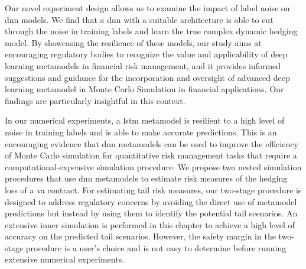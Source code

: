Our novel experiment design allows us to examine the impact of label noise on \gls{dnn} models.
We find that a \gls{dnn} with a suitable architecture is able to cut through the noise in training labels and learn the true complex dynamic hedging model.
By showcasing the resilience of these models, our study aims at encouraging regulatory bodies to recognize the value and applicability of deep learning metamodels in financial risk management, and it provides informed suggestions and guidance for the incorporation and oversight of advanced deep learning metamodel in Monte Carlo Simulation in financial applications.
Our findings are particularly insightful in this context.

In our numerical experiments, a \gls{lstm} metamodel is resilient to a high level of noise in training labels and is able to make accurate predictions. 
This is an encouraging evidence that \gls{dnn} metamodels can be used to improve the efficiency of Monte Carlo simulation for quantitative risk management tasks that require a computational-expensive simulation procedure.
We propose two nested simulation procedures that use \gls{dnn} metamodels to estimate risk measures of the hedging loss of a \gls{va} contract.
For estimating tail risk measures, our two-stage procedure is designed to address regulatory concerns by avoiding the direct use of metamodel predictions but instead by using them to identify the potential tail scenarios.
An extensive inner simulation is performed in this chapter to achieve a high level of accuracy on the predicted tail scenarios.
However, the safety margin in the two-stage procedure is a user's choice and is not easy to determine before running extensive numerical experiments.

